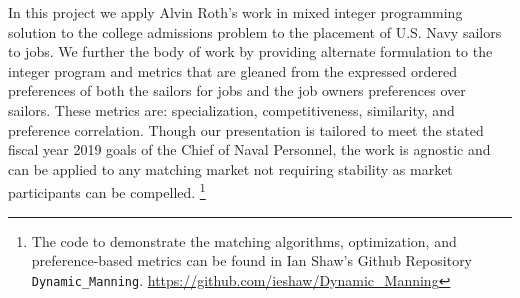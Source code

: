 In this project we apply Alvin Roth's work in mixed integer programming solution to the college admissions problem to the placement of U.S. Navy sailors to jobs. We further the body of work by providing alternate formulation to the integer program and metrics that are gleaned from the expressed ordered preferences of both the sailors for jobs and the job owners preferences over sailors. These metrics are: specialization, competitiveness, similarity, and preference correlation. Though our presentation is tailored to meet the stated fiscal year 2019 goals of the Chief of Naval Personnel, the work is agnostic and can be applied to any matching market not requiring stability as market participants can be compelled.  \footnote{The code to demonstrate the matching algorithms, optimization, and preference-based metrics can be found in Ian Shaw's Github Repository \texttt{Dynamic\_Manning}. \url{https://github.com/ieshaw/Dynamic_Manning}}
